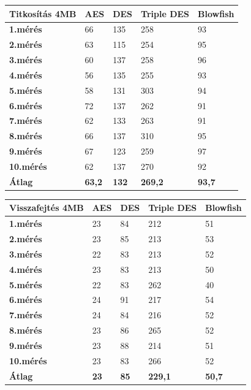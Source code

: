 \newpage
\begin{center}
	\begin{tabular}{|p{2.4cm}|p{2cm}|p{2cm}|p{2cm}|p{2cm}|}
		\hline
		\textbf{Titkosítás} \newline \textbf{4MB} & \textbf{AES} & \textbf{DES} & \textbf{Triple DES} & \textbf{Blowfish}\\
		\hline
		\textbf{1.mérés} & 66 & 135 & 258 & 93\\
		\hline
		\textbf{2.mérés} & 63 & 115 & 254 & 95\\
		\hline
		\textbf{3.mérés} & 60 & 137 & 258 & 96\\
		\hline
		\textbf{4.mérés} & 56 & 135 & 255 & 93\\
		\hline
		\textbf{5.mérés} & 58 & 131 & 303 & 94\\
		\hline
		\textbf{6.mérés} & 72 & 137 & 262 & 91\\
		\hline
		\textbf{7.mérés} & 62 & 133 & 263 & 91\\
		\hline
		\textbf{8.mérés} & 66 & 137 & 310 & 95\\
		\hline
		\textbf{9.mérés} & 67 & 123 & 259 & 97\\
		\hline
		\textbf{10.mérés} & 62 & 137 & 270 & 92\\
		\hline
		\hline
		\textbf{Átlag} & \textbf{63,2} & \textbf{132} & \textbf{269,2} & \textbf{93,7}\\
		\hline
	\end{tabular}
\end{center}

\begin{center}
	\begin{tabular}{|p{2.4cm}|p{2cm}|p{2cm}|p{2cm}|p{2cm}|}
		\hline
		\textbf{Visszafejtés} \newline \textbf{4MB} & \textbf{AES} & \textbf{DES} & \textbf{Triple DES} & \textbf{Blowfish}\\
		\hline
		\textbf{1.mérés} & 23 & 84 & 212 & 51\\
		\hline
		\textbf{2.mérés} & 23 & 85 & 213 & 53\\
		\hline
		\textbf{3.mérés} & 22 & 83 & 213 & 52\\
		\hline
		\textbf{4.mérés} & 23 & 83 & 213 & 50\\
		\hline
		\textbf{5.mérés} & 22 & 83 & 262 & 40\\
		\hline
		\textbf{6.mérés} & 24 & 91 & 217 & 54\\
		\hline
		\textbf{7.mérés} & 24 & 84 & 216 & 52\\
		\hline
		\textbf{8.mérés} & 23 & 86 & 265 & 52\\
		\hline
		\textbf{9.mérés} & 23 & 88 & 214 & 51\\
		\hline
		\textbf{10.mérés} & 23 & 83 & 266 & 52\\
		\hline
		\hline
		\textbf{Átlag} & \textbf{23} & \textbf{85} & \textbf{229,1} & \textbf{50,7}\\
		\hline
	\end{tabular}
\end{center}


